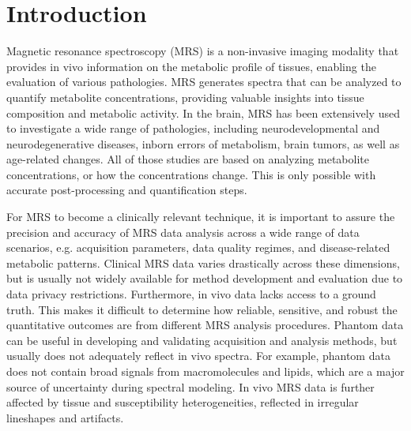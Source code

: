 \section{Introduction}\label{sec:Introduction}
Magnetic resonance spectroscopy (MRS) is a non-invasive imaging modality that provides in vivo information on the metabolic profile of tissues, enabling the evaluation of various pathologies. MRS generates spectra that can be analyzed to quantify metabolite concentrations, providing valuable insights into tissue composition and metabolic activity. In the brain, MRS has been extensively used to investigate a wide range of pathologies, including neurodevelopmental\cite{Augustine2008,Laccetta2022,Tomiyasu2022} and neurodegenerative diseases\cite{Gao2014,Martin2007,McKiernan2023,Oz2016}, inborn errors of metabolism\cite{Cecil2006,Gropman2020,Lai2022}, brain tumors\cite{Calvar2005,Lukas2004,Padelli2022,Nelson2003}, as well as age-related changes\cite{Forester2010,Inglese2004,Reyngoudt2012}. All of those studies are based on analyzing metabolite concentrations, or how the concentrations change. This is only possible with accurate post-processing and quantification steps.
 
For MRS to become a clinically relevant technique, it is important to assure the precision and accuracy of MRS data analysis across a wide range of data scenarios, e.g. acquisition parameters, data quality regimes, and disease-related metabolic patterns. Clinical MRS data varies drastically across these dimensions, but is usually not widely available for method development and evaluation due to data privacy restrictions. Furthermore, in vivo data lacks access to a ground truth. This makes it difficult to determine how reliable, sensitive, and robust the quantitative outcomes are from different MRS analysis procedures. Phantom data can be useful in developing and validating acquisition and analysis methods, but usually does not adequately reflect in vivo spectra. For example, phantom data does not contain broad signals from macromolecules and lipids, which are a major source of uncertainty during spectral modeling. In vivo MRS data is further affected by tissue and susceptibility heterogeneities, reflected in irregular lineshapes and artifacts.
 
